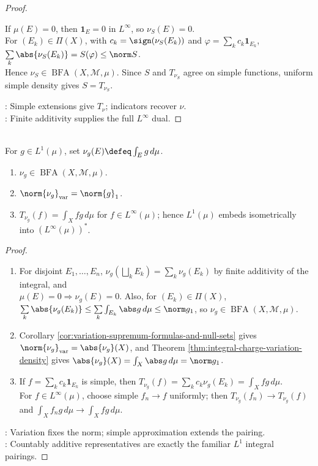 \begin{theorem}
\begin{proof}
\begin{enumerate}[label=(\roman*)]
If $\mu(E)=0$, then $\mathbf 1_E=0$ in $L^\infty$, so $\nu_S(E)=0$.\\
For $(E_k)\in\Pi(X)$, with $c_k=\sign(\nu_S(E_k))$ and $\varphi=\sum\limits_kc_k\mathbf 1_{E_k}$, $\sum\limits_k\abs{\nu_S(E_k)}=S(\varphi)\leq\norm S$.\\
Hence $\nu_S\in\operatorname{BFA}(X,\mathcal M,\mu)$. Since $S$ and $T_{\nu_S}$ agree on simple functions, uniform simple density gives $S=T_{\nu_S}$.
\end{enumerate}
: Simple extensions give $T_\nu$; indicators recover $\nu$.\\
: Finite additivity supplies the full $L^\infty$ dual.
\end{proof}
\end{theorem}

\begin{proposition} \label{prop:l1-countably-additive-part-of-linfty-dual} \\
For $g\in L^1(\mu)$, set $\nu_g(E)\defeq\int_E g\,d\mu$.
\begin{enumerate}[label=(\roman*)]
\setlength{\itemsep}{0pt}
\item $\nu_g\in\operatorname{BFA}(X,\mathcal M,\mu)$.
\item $\norm{\nu_g}_{\mathrm{var}}=\norm{g}_1$.
\item $T_{\nu_g}(f)=\int_Xfg\,d\mu$ for $f\in L^\infty(\mu)$; hence $L^1(\mu)$ embeds isometrically into $(L^\infty(\mu))^*$.
\end{enumerate}
\begin{proof}
\begin{enumerate}[label=(\roman*)]
\setlength{\itemsep}{0pt}
\item For disjoint $E_1,\ldots,E_n$, $\nu_g(\bigsqcup\limits_kE_k)=\sum\limits_k\nu_g(E_k)$ by finite additivity of the integral, and\\
$\mu(E)=0\Rightarrow\nu_g(E)=0$. Also, for $(E_k)\in\Pi(X)$, $\sum\limits_k\abs{\nu_g(E_k)}\leq\sum\limits_k\int_{E_k}\abs g\,d\mu\leq\norm g_1$, so $\nu_g\in\operatorname{BFA}(X,\mathcal M,\mu)$.
\item Corollary \ref{cor:variation-supremum-formulas-and-null-sets} gives $\norm{\nu_g}_{\mathrm{var}}=\abs{\nu_g}(X)$, and Theorem \ref{thm:integral-charge-variation-density} gives $\abs{\nu_g}(X)=\int_X\abs g\,d\mu=\norm g_1$.
\item If $f=\sum\limits_kc_k\mathbf 1_{E_k}$ is simple, then $T_{\nu_g}(f)=\sum\limits_kc_k\nu_g(E_k)=\int_Xfg\,d\mu$.\\
For $f\in L^\infty(\mu)$, choose simple $f_n\to f$ uniformly; then $T_{\nu_g}(f_n)\to T_{\nu_g}(f)$ and $\int_Xf_ng\,d\mu\to\int_Xfg\,d\mu$.
\end{enumerate}
: Variation fixes the norm; simple approximation extends the pairing.\\
: Countably additive representatives are exactly the familiar $L^1$ integral pairings.
\end{proof}
\end{proposition}


